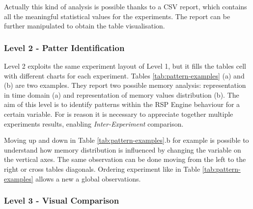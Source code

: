 Actually this kind of analysis is possible thanks to a CSV report, which contains all the meaningful statistical values for the experiments. The report can be further manipulated to obtain the table visualisation.

\subsubsection{Level 2 - Patter Identification}\label{sec:impl-level2}

%  	




\noindent Level 2 exploits the same experiment layout of Level 1, but it fills the tables cell with different charts for each experiment. Tables \ref{tab:pattern-examples} (a) and (b) are two examples. They report two possible memory analysis: representation in time domain (a) and representation of memory values distribution (b). The aim of this level is to identify patterns within the RSP Engine behaviour for a certain variable. For is reason it is necessary to appreciate together multiple experiments results, enabling \textit{Inter-Experiment} comparison.

Moving up and down in Table \ref{tab:pattern-examples}.b for example is possible to understand how memory distribution is influenced by changing the variable on the vertical axes. The same observation can be done moving from the left to the right or cross tables diagonals. Ordering experiment like in Table \ref{tab:pattern-examples} allows a new a global observations.

\subsubsection{Level 3 - Visual Comparison}\label{sec:impl-level3}


